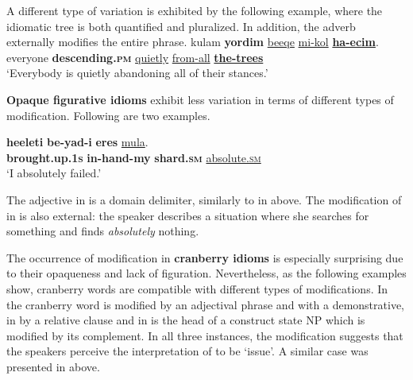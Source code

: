 \documentclass[output=paper]{langsci/langscibook}
\begin{document}
A different type of variation is exhibited by the following example, where the idiomatic tree is both quantified and pluralized. In addition, the adverb  externally modifies the entire phrase.
    \ea\label{ec-ins-ext-mod-quant-plural}
        \gll kulam \textbf{yordim} \underline{be{\shin}eqe{\tet}} \underline{mi-kol} \textbf{\underline{ha-{\ayin}ecim}}.\\
            everyone \textbf{descending.\textsc{pm}} \underline{quietly} \underline{from-all} \textbf{\underline{the-trees}}\\
        \glt `Everybody is quietly abandoning all of their stances.'
    \z

\textbf{Opaque figurative idioms} exhibit less variation in terms of different types of modification. Following are two examples.

    \ea\label{xeres-ins-int-mod}
        \gll \textbf{he{\ayin}eleti} \textbf{be-yad-i} \textbf{{\het}eres} \underline{mu{\het}la{\tet}}.\\
            \textbf{brought.up.\textsc{1s}} \textbf{ in-hand-my}  \textbf{shard.\textsc{sm}}  \underline{absolute.\textsc{sm}}  \\
        \glt `I absolutely failed.'
    \z

The adjective  in  is a domain delimiter, similarly to  in  above. The modification of  in  is also external: the speaker describes a situation where she searches for something and finds \emph{absolutely} nothing.

The occurrence of modification in \textbf{cranberry idioms} is especially surprising due to their opaqueness and lack of figuration. Nevertheless, as the following examples show, cranberry words are compatible with different types of modifications. In  the cranberry word  is modified by an adjectival phrase and with a demonstrative, in  by a relative clause and in   is the head of a construct state NP which is modified by its complement. In all three instances, the modification suggests that the speakers perceive the interpretation of  to be `issue'. A similar case was presented in  above.
\end{document}
